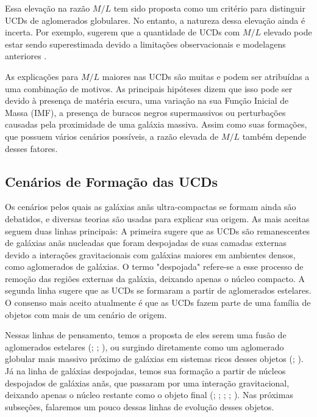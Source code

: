 Essa elevação na razão $M/L$ tem sido proposta como um critério para distinguir UCDs de aglomerados globulares. No entanto, a natureza dessa elevação ainda é incerta. Por exemplo, \cite{Voggel_2018} sugerem que a quantidade de UCDs com $M/L$ elevado pode estar sendo superestimada devido a limitações observacionais e modelagens anteriores .

As explicações para $M/L$ maiores nas UCDs são muitas e podem ser atribuídas a uma combinação de motivos. As principais hipóteses dizem que isso pode ser devido à presença de matéria escura, uma variação na sua Função Inicial de Massa (IMF), a presença de buracos negros supermassivos ou perturbações causadas pela proximidade de uma galáxia massiva. Assim como suas formações, que possuem vários cenários possíveis, a razão elevada de $M/L$ também depende desses fatores.

\subsection{Cenários de Formação das UCDs}\label{subsec:formacao}

Os cenários pelos quais as galáxias anãs ultra-compactas se formam ainda são debatidos, e diversas teorias são usadas para explicar sua origem. As mais aceitas seguem duas linhas principais: A primeira sugere que as UCDs são remanescentes de galáxias anãs nucleadas que foram despojadas de suas camadas externas devido a interações gravitacionais com galáxias maiores em ambientes densos, como aglomerados de galáxias. O termo "despojada" refere-se a esse processo de remoção das regiões externas da galáxia, deixando apenas o núcleo compacto. A segunda linha sugere que as UCDs se formaram a partir de aglomerados estelares. O consenso mais aceito atualmente é que as UCDs fazem parte de uma família de objetos com mais de um cenário de origem.

Nessas linhas de pensamento, temos a proposta de eles serem uma fusão de aglomerados estelares (\citealp{Kroupa_1998}; \citealp{Fellhauer_2002}; \citealp{Br_ns_2012}), ou surgindo diretamente como um aglomerado globular mais massivo próximo de galáxias em sistemas ricos desses objetos (\citealp{Mieske_2002}; \citealp{Mieske_2011}). Já na linha de galáxias despojadas, temos sua formação a partir de núcleos despojados de galáxias anãs, que passaram por uma interação gravitacional, deixando apenas o núcleo restante como o objeto final (\citealp{Bassino_1994}; \citealp{Bekki_2001}; \citealp{Drinkwater_2003}; \citealp{Goerdt_2008}; \citealp{Pfeffer_2013}). Nas próximas subseções, falaremos um pouco dessas linhas de evolução desses objetos.

